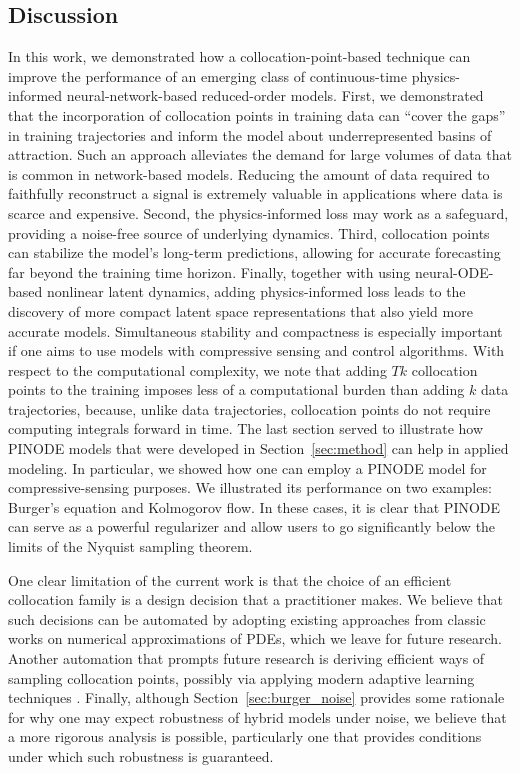 \subsection{Discussion} 
In this work, we demonstrated how a collocation-point-based technique can improve the performance of an emerging class of continuous-time physics-informed neural-network-based reduced-order models. First, we demonstrated that the incorporation of collocation points in training data can ``cover the gaps'' in training trajectories and inform the model about underrepresented basins of attraction. Such an approach alleviates the demand for large volumes of data that is common in network-based models. Reducing the amount of data required to faithfully reconstruct a signal is extremely valuable in applications where data is scarce and expensive. Second, the physics-informed loss may work as a safeguard, providing a noise-free source of underlying dynamics.
Third, collocation points can stabilize the model's long-term predictions, allowing for accurate forecasting far beyond the training time horizon. Finally, together with using neural-ODE-based nonlinear latent dynamics, adding physics-informed loss leads to the discovery of more compact latent space representations that also yield more accurate models. Simultaneous stability and compactness is especially important if one aims to use models with compressive sensing and control algorithms. With respect to the computational complexity, we note that adding $Tk$ collocation points to the training imposes less of a computational burden than adding $k$ data trajectories, because, unlike data trajectories, collocation points do not require computing integrals forward in time. The last section served to illustrate how PINODE models that were developed in Section~\ref{sec:method} can help in applied modeling. In particular, we showed how one can employ a PINODE model for compressive-sensing purposes. We illustrated its performance on two examples: Burger's equation and Kolmogorov flow. In these cases, it is clear that PINODE can serve as a powerful regularizer and allow users to go significantly below the limits of the Nyquist sampling theorem. 

One clear limitation of the current work is that the choice of an efficient collocation family is a design decision that a practitioner makes. We believe that such decisions can be automated by adopting existing approaches from classic works on numerical approximations of PDEs, which we leave for future research. Another automation that prompts future research is deriving efficient ways of sampling collocation points, possibly via applying modern adaptive learning techniques \cite{subramanian2022adaptive}. Finally, although Section~\ref{sec:burger_noise} provides some rationale for why one may expect robustness of hybrid models under noise, we believe that a more rigorous analysis is possible, particularly one that provides conditions under which such robustness is guaranteed. 
